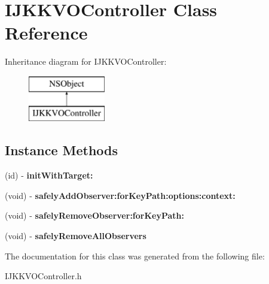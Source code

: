 \hypertarget{interface_i_j_k_k_v_o_controller}{}\section{I\+J\+K\+K\+V\+O\+Controller Class Reference}
\label{interface_i_j_k_k_v_o_controller}
Inheritance diagram for I\+J\+K\+K\+V\+O\+Controller\+:\begin{figure}[H]
\begin{center}
\leavevmode
\includegraphics[height=2.000000cm]{interface_i_j_k_k_v_o_controller}
\end{center}
\end{figure}
\subsection*{Instance Methods}
\begin{DoxyCompactItemize}
\item 
\mbox{\label{interface_i_j_k_k_v_o_controller_ae20030eb76b02f1d6b4c0af238385feb}} 
(id) -\/ {\bfseries init\+With\+Target\+:}
\item 
\mbox{\label{interface_i_j_k_k_v_o_controller_afc65b1c9d1cdd9e175f7f49114760dbe}} 
(void) -\/ {\bfseries safely\+Add\+Observer\+:for\+Key\+Path\+:options\+:context\+:}
\item 
\mbox{\label{interface_i_j_k_k_v_o_controller_a672f4972a2aedc6386c563127210571f}} 
(void) -\/ {\bfseries safely\+Remove\+Observer\+:for\+Key\+Path\+:}
\item 
\mbox{\label{interface_i_j_k_k_v_o_controller_a99dccbac8f018dc3e727c4d70c611003}} 
(void) -\/ {\bfseries safely\+Remove\+All\+Observers}
\end{DoxyCompactItemize}


The documentation for this class was generated from the following file\+:\begin{DoxyCompactItemize}
\item 
I\+J\+K\+K\+V\+O\+Controller.\+h\end{DoxyCompactItemize}
